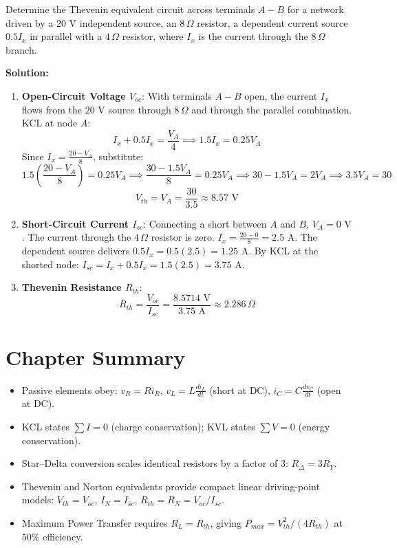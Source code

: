\begin{example}
Determine the Thevenin equivalent circuit across terminals $A-B$ for a network driven by a $20\text{ V}$ independent source, an $8\,\Omega$ resistor, a dependent current source $0.5 I_x$ in parallel with a $4\,\Omega$ resistor, where $I_x$ is the current through the $8\,\Omega$ branch.

\textbf{Solution:}
\begin{enumerate}
    \item \textbf{Open-Circuit Voltage $V_{oc}$}:
    With terminals $A-B$ open, the current $I_x$ flows from the $20\text{ V}$ source through $8\,\Omega$ and through the parallel combination. KCL at node $A$:
    \[ I_x + 0.5 I_x = \frac{V_A}{4} \implies 1.5 I_x = 0.25 V_A \]
    Since $I_x = \frac{20 - V_A}{8}$, substitute:
    \[ 1.5 \left(\frac{20 - V_A}{8}\right) = 0.25 V_A \implies \frac{30 - 1.5 V_A}{8} = 0.25 V_A \implies 30 - 1.5 V_A = 2 V_A \implies 3.5 V_A = 30 \]
    \[ V_{th} = V_A = \frac{30}{3.5} \approx 8.57\text{ V} \]
    \item \textbf{Short-Circuit Current $I_{sc}$}:
    Connecting a short between $A$ and $B$, $V_A = 0\text{ V}$.
    The current through the $4\,\Omega$ resistor is zero.
    $I_x = \frac{20 - 0}{8} = 2.5\text{ A}$.
    The dependent source delivers $0.5 I_x = 0.5(2.5) = 1.25\text{ A}$.
    By KCL at the shorted node: $I_{sc} = I_x + 0.5 I_x = 1.5(2.5) = 3.75\text{ A}$.
    \item \textbf{Thevenin Resistance $R_{th}$}:
    \[ R_{th} = \frac{V_{oc}}{I_{sc}} = \frac{8.5714\text{ V}}{3.75\text{ A}} \approx 2.286\,\Omega \]
\end{enumerate}
\end{example}

\section{Chapter Summary}
\begin{itemize}[leftmargin=1.5em]
    \item Passive elements obey: $v_R = R i_R$, $v_L = L \frac{di_L}{dt}$ (short at DC), $i_C = C \frac{dv_C}{dt}$ (open at DC).
    \item KCL states $\sum I = 0$ (charge conservation); KVL states $\sum V = 0$ (energy conservation).
    \item Star--Delta conversion scales identical resistors by a factor of 3: $R_\Delta = 3 R_Y$.
    \item Thevenin and Norton equivalents provide compact linear driving-point models: $V_{th} = V_{oc}$, $I_N = I_{sc}$, $R_{th} = R_N = V_{oc} / I_{sc}$.
    \item Maximum Power Transfer requires $R_L = R_{th}$, giving $P_{max} = V_{th}^2 / (4 R_{th})$ at $50\%$ efficiency.
\end{itemize}
